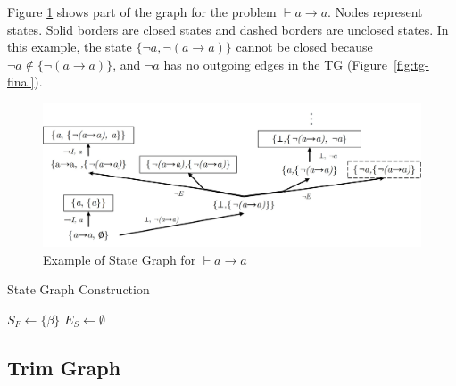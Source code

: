 Figure \ref{fig:st-ex} shows part of the graph for the problem \(\vdash a \to a\). Nodes represent states. Solid borders are closed states and dashed borders are unclosed states. In this example, the state $\{\lnot a, \lnot(a \to a)\}$ cannot be closed because $\lnot a \notin \{\lnot(a \to a)\}$, and $\lnot a$ has no outgoing edges in the TG (Figure~\ref{fig:tg-final}).

\begin{figure}
    \centering
    \includegraphics[width=1\linewidth]{resources/sg-gen.jpg}
    \caption{Example of State Graph for \(\vdash a \to a\)}
    \label{fig:st-ex}
\end{figure}

\begin{algorithm}
\caption{State Graph Construction}

$S_F \leftarrow \{\beta\}$ 
$E_S \leftarrow \emptyset$ 

\end{algorithm}

\subsection{Trim Graph}

